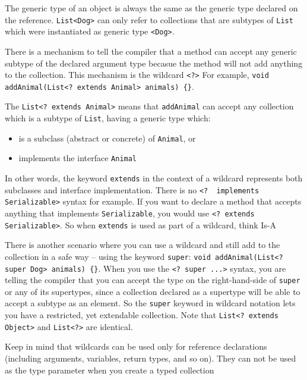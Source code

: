 The generic type of an object is always the same as the generic type declared 
on the reference. \verb#List<Dog># can only refer to collections that are 
subtypes of \verb#List# which were instantiated as generic type \verb#<Dog>#.

There is a mechanism to tell the compiler that a method can accept any generic 
subtype of the declared argument type becasue the method will not add anything 
to the collection. This mechanism is the wildcard \verb#<?># For example, 
\verb#void addAnimal(List<? extends Animal> animals) {}#. 

The \verb#List<? extends Animal># means that \verb#addAnimal# can accept any 
collection which is a subtype of \verb#List#, having a generic type which:
\begin{itemize}
    \item is a subclass (abstract or concrete) of \verb#Animal#, or
    \item implements the interface \verb#Animal#
\end{itemize}
In other words, the keyword \verb#extends# in the context of a wildcard 
represents both subclasses and interface implementation. There is no
\verb#<?  implements Serializable># syntax for example. If you want to declare 
a method that accepts anything that implements \verb#Serializable#, you would 
use \verb#<? extends Serializable>#. So when \verb#extends# is used as part of 
a wildcard, think Is-A

There is another scenario where you can use a wildcard and still add to the 
collection in a safe way -- using the keyword \verb#super#:
\verb#void addAnimal(List<? super Dog> animals) {}#. When you use the
\verb#<? super ...># syntax, you are telling the compiler that you can accept 
the type on the right-hand-side of \verb#super# or any of its supertypes, since 
a collection declared as a supertype will be able to accept a subtype as an 
element. So the \verb#super# keyword in wildcard notation lets you have a 
restricted, yet extendable collection. Note that \verb#List<? extends Object># 
and \verb#List<?># are identical.

Keep in mind that wildcards can be used only for reference declarations 
(including arguments, variables, return types, and so on). They can not be used 
as the type parameter when you create a typed collection

